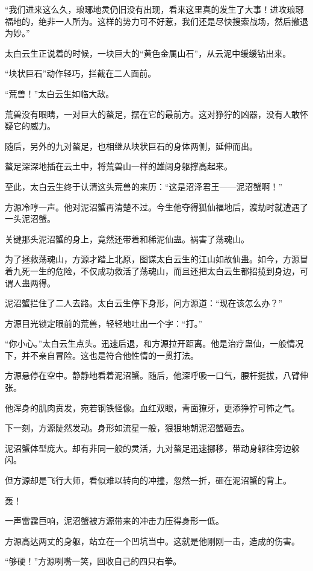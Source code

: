 \begin{this_body}
“我们进来这么久，琅琊地灵仍旧没有出现，看来这里真的发生了大事！进攻琅琊福地的，绝非一人所为。这样的势力可不好惹，我们还是尽快搜索战场，然后撤退为妙。”

太白云生正说着的时候，一块巨大的“黄色金属山石”，从云泥中缓缓钻出来。

“块状巨石”动作轻巧，拦截在二人面前。

“荒兽！”太白云生如临大敌。

荒兽没有眼睛，一对巨大的螯足，摆在它的最前方。这对狰狞的凶器，没有人敢怀疑它的威力。

随后，另外的九对螯足，也相继从块状巨石的身体两侧，延伸而出。

螯足深深地插在云土中，将荒兽山一样的雄阔身躯撑高起来。

至此，太白云生终于认清这头荒兽的来历：“这是沼泽君王——泥沼蟹啊！”

方源冷哼一声。他对泥沼蟹再清楚不过。今生他夺得狐仙福地后，渡劫时就遭遇了一头泥沼蟹。

关键那头泥沼蟹的身上，竟然还带着和稀泥仙蛊。祸害了荡魂山。

为了拯救荡魂山，方源才踏上北原，图谋太白云生的江山如故仙蛊。如今，方源冒着九死一生的危险，不仅成功救活了荡魂山，而且还把太白云生都招揽到身边，可谓人蛊两得。

泥沼蟹拦住了二人去路。太白云生停下身形，问方源道：“现在该怎么办？”

方源目光锁定眼前的荒兽，轻轻地吐出一个字：“打。”

“你小心。”太白云生点头。迅速后退，和方源拉开距离。他是治疗蛊仙，一般情况下，并不亲自冒险。这也是符合他性情的一贯打法。

方源悬停在空中。静静地看着泥沼蟹。随后，他深呼吸一口气，腰杆挺拔，八臂伸张。

他浑身的肌肉贲发，宛若钢铁怪像。血红双眼，青面獠牙，更添狰狞可怖之气。

下一刻，方源陡然发动。身形如流星一般，狠狠地朝泥沼蟹砸去。

泥沼蟹体型庞大。却有非同一般的灵活，九对螯足迅速挪移，带动身躯往旁边躲闪。

但方源却是飞行大师，看似难以转向的冲撞，忽然一折，砸在泥沼蟹的背上。

轰！

一声雷霆巨响，泥沼蟹被方源带来的冲击力压得身形一低。

方源高达两丈的身躯，站立在一个凹坑当中。这就是他刚刚一击，造成的伤害。

“够硬！”方源咧嘴一笑，回收自己的四只右拳。


\end{this_body}
